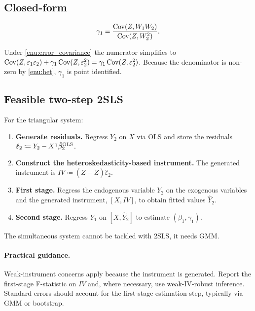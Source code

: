 \subsection{Closed-form}

\begin{equation}
\gamma_{1}=\frac{\operatorname{Cov}(Z,W_{1}W_{2})}{\operatorname{Cov}(Z,W_{2}^{2})}.\label{eq:gamma1_id}
\end{equation}

\begin{remark}
Under \ref{enu:error_covariance} the numerator simplifies to $\operatorname{Cov}(Z,\varepsilon_{1}\varepsilon_{2})+\gamma_{1}\operatorname{Cov}(Z,\varepsilon_{2}^{2})=\gamma_{1}\operatorname{Cov}(Z,\varepsilon_{2}^{2})$.
Because the denominator is non-zero by \ref{enu:het}, $\gamma_{1}$
is point identified. \end{remark}

\subsection{Feasible two-step 2SLS}

\label{subsec:2SLS}

For the triangular system:
\begin{enumerate}
\itemsep2pt
\item \textbf{Generate residuals.} Regress $Y_{2}$ on $X$ via OLS and
store the residuals $\hat{\varepsilon}_{2}\coloneqq Y_{2}-X^{\intercal}\hat{\beta}_{2}^{\text{OLS}}$.
\item \textbf{Construct the heteroskedasticity-based instrument.} The generated
instrument is $IV\coloneqq(Z-\bar{Z})\hat{\varepsilon}_{2}$.
\item \textbf{First stage.} Regress the endogenous variable $Y_{2}$ on
the exogenous variables and the generated instrument, $[X,IV]$, to
obtain fitted values $\hat{Y}_{2}$.
\item \textbf{Second stage.} Regress $Y_{1}$ on $[X,\hat{Y}_{2}]$ to estimate
$(\beta_{1},\gamma_{1})$.
\end{enumerate}
The simultaneous system cannot be tackled with 2SLS, it needs GMM.

\paragraph{Practical guidance.}

Weak-instrument concerns apply because the instrument is generated.
Report the first-stage F-statistic on $IV$ and, where necessary,
use weak-IV-robust inference. Standard errors should account for the
first-stage estimation step, typically via GMM or bootstrap.


